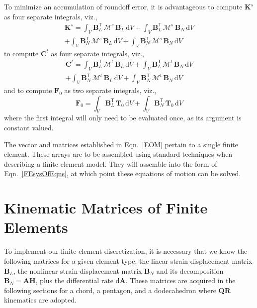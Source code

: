To minimize an accumulation of roundoff error, it is advantageous to compute $\mathbf{K}^s$ as four separate integrals, viz.,
\begin{multline*}
\mathbf{K}^s = \int_V \mathbf{B}_L^{\mathsf{T}} \, 
\boldsymbol{\mathcal{M}}^s \, \mathbf{B}_L \, \mathrm{d}V + 
\int_V \mathbf{B}_L^{\mathsf{T}} \, \boldsymbol{\mathcal{M}}^s \, 
\mathbf{B}_N \, \mathrm{d}V \\ + 
\int_V \mathbf{B}_N^{\mathsf{T}} \, \boldsymbol{\mathcal{M}}^s \, 
\mathbf{B}_L \, \mathrm{d}V + 
\int_V \mathbf{B}_N^{\mathsf{T}} \, \boldsymbol{\mathcal{M}}^s \, 
\mathbf{B}_N \, \mathrm{d}V
\end{multline*}
to compute $\mathbf{C}^t$ as four separate integrals, viz.,
\begin{multline*}
\mathbf{C}^t = \int_V \mathbf{B}_L^{\mathsf{T}} \, 
\boldsymbol{\mathcal{M}}^t \, \mathbf{B}_L \, \mathrm{d}V + 
\int_V \mathbf{B}_L^{\mathsf{T}} \, \boldsymbol{\mathcal{M}}^t \, 
\mathbf{B}_N \, \mathrm{d}V \\ + 
\int_V \mathbf{B}_N^{\mathsf{T}} \, \boldsymbol{\mathcal{M}}^t \, 
\mathbf{B}_L \, \mathrm{d}V + 
\int_V \mathbf{B}_N^{\mathsf{T}} \, \boldsymbol{\mathcal{M}}^t \, 
\mathbf{B}_N \, \mathrm{d}V
\end{multline*}
and to compute $\boldsymbol{F}_0$ as two separate integrals, viz.,
\begin{equation*}
    \boldsymbol{F}_0 = \int_V \mathbf{B}_L^{\mathsf{T}} \, 
        \boldsymbol{T}_0 \, \mathrm{d}V + 
        \int_V \mathbf{B}_N^{\mathsf{T}} \, 
        \boldsymbol{T}_0 \, \mathrm{d}V 
\end{equation*}
where the first integral will only need to be evaluated once, as its argument is constant valued.

The vector and matrices established in Eqn.~\eqref{EOM} pertain to a single finite element.  These arrays are to be assembled using standard techniques \cite{ClaytonChung18} when describing a finite element model.  They will assemble into the form of Eqn.~\eqref{FEsysOfEqns}, at which point these equations of motion can be solved.


\section{Kinematic Matrices of Finite Elements}

To implement our finite element discretization, it is necessary that we know the following matrices for a given element type: the linear strain-displacement matrix $\mathbf{B}_L$, the nonlinear strain-displacement matrix $\mathbf{B}_N$ and its decomposition $\mathbf{B}_N = \mathbf{AH}$, plus the differential rate $\mathrm{d}\mathbf{A}$.  These matrices are acquired in the following sections for a chord, a pentagon, and a dodecahedron where \textbf{QR} kinematics are adopted.

